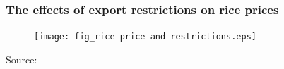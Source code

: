 \documentclass[svgnames]{beamer}
\begin{document}


\begin{frame}[label=frame-export-restrictions]
	\frametitle{The effects of export restrictions on rice prices}
	\begin{figure}
		\centering
		\texttt{[image: fig\_rice-price-and-restrictions.eps]}
	\end{figure}
	\vspace{-2em}
	\tiny{Source: \textcite{Headey:2011a}}
\end{frame}




\backupend
\end{document}
